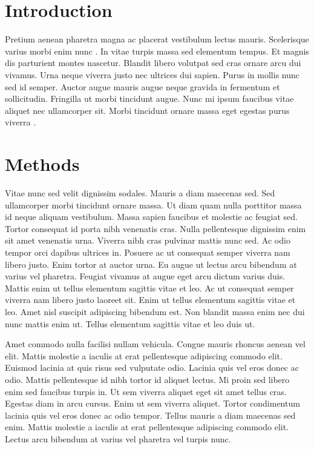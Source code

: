 \hypertarget{introduction}{%
\section{Introduction}\label{introduction}}

Pretium aenean pharetra magna ac placerat vestibulum lectus mauris.
Scelerisque varius morbi enim nunc \cite{Coplen-2007}. In vitae turpis
massa sed elementum tempus. Et magnis dis parturient montes nascetur.
Blandit libero volutpat sed cras ornare arcu dui vivamus. Urna neque
viverra justo nec ultrices dui sapien. Purus in mollis nunc sed id
semper. Auctor augue mauris augue neque gravida in fermentum et
sollicitudin. Fringilla ut morbi tincidunt augue. Nunc mi ipsum faucibus
vitae aliquet nec ullamcorper sit. Morbi tincidunt ornare massa eget
egestas purus viverra .

\hypertarget{methods}{%
\section{Methods}\label{methods}}

\label{sec:methods}

Vitae nunc sed velit dignissim sodales. Mauris a diam maecenas sed. Sed
ullamcorper morbi tincidunt ornare massa. Ut diam quam nulla porttitor
massa id neque aliquam vestibulum. Massa sapien faucibus et molestie ac
feugiat sed. Tortor consequat id porta nibh venenatis cras. Nulla
pellentesque dignissim enim sit amet venenatis urna. Viverra nibh cras
pulvinar mattis nunc sed. Ac odio tempor orci dapibus ultrices in.
Posuere ac ut consequat semper viverra nam libero justo. Enim tortor at
auctor urna. Eu augue ut lectus arcu bibendum at varius vel pharetra.
Feugiat vivamus at augue eget arcu dictum varius duis. Mattis enim ut
tellus elementum sagittis vitae et leo. Ac ut consequat semper viverra
nam libero justo laoreet sit. Enim ut tellus elementum sagittis vitae et
leo. Amet nisl suscipit adipiscing bibendum est. Non blandit massa enim
nec dui nunc mattis enim ut. Tellus elementum sagittis vitae et leo duis
ut.

Amet commodo nulla facilisi nullam vehicula. Congue mauris rhoncus
aenean vel elit. Mattis molestie a iaculis at erat pellentesque
adipiscing commodo elit. Euismod lacinia at quis risus sed vulputate
odio. Lacinia quis vel eros donec ac odio. Mattis pellentesque id nibh
tortor id aliquet lectus. Mi proin sed libero enim sed faucibus turpis
in. Ut sem viverra aliquet eget sit amet tellus cras. Egestas diam in
arcu cursus. Enim ut sem viverra aliquet. Tortor condimentum lacinia
quis vel eros donec ac odio tempor. Tellus mauris a diam maecenas sed
enim. Mattis molestie a iaculis at erat pellentesque adipiscing commodo
elit. Lectus arcu bibendum at varius vel pharetra vel turpis nunc.

